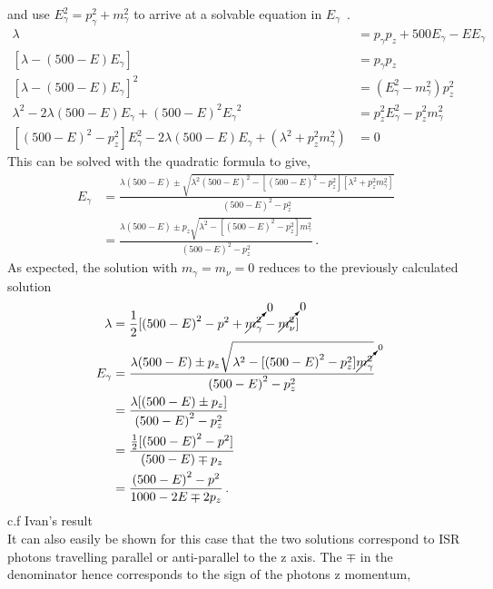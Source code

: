  and use  ${E}_{\gamma}^{2} = {p}_{\gamma}^{2} +{m}_{\gamma}^{2} $ to arrive at a solvable equation in ${E}_{\gamma} $\, .
  \begin{align}
 {\lambda} &=   {p}_{\gamma}{p}_{z} + 500{E}_{\gamma} - E{E}_{\gamma} \\
  [{\lambda} - (500 - E){E}_{\gamma} ] &=   {p}_{\gamma}{p}_{z} \\
    {[{\lambda} - (500 - E){E}_{\gamma} ]}^{2} &= ({E}_{\gamma}^{2} - {m}_{\gamma}^{2}){p}_{z}^{2} \\
    {\lambda}^{2} - 2{\lambda}(500 - E){E}_{\gamma}  + {(500 - E)}^{2}{{E}_{\gamma}}^{2} &=   {p}_{z}^{2}{E}_{\gamma}^{2} - {p}_{z}^{2}{m}_{\gamma}^{2} \\
        [{(500 - E)}^{2} -   {p}_{z}^{2}]{E}_{\gamma}^{2}  - 2{\lambda}(500 - E){E}_{\gamma} +  ({\lambda}^{2} + {p}_{z}^{2}{m}_{\gamma}^{2})  &= 0
     \end{align}
This can be solved with the quadratic formula to give,
  \begin{align}
 {E}_{\gamma} &= \frac{{\lambda}(500 - E)  \pm \sqrt{ {\lambda}^{2}{(500 - E)}^{2} - [{(500 - E)}^{2} -   {p}_{z}^{2}][{\lambda}^{2} + {p}_{z}^{2}{m}_{\gamma}^{2}] }}{{(500 - E)}^{2} -   {p}_{z}^{2}}\\
 					&= \frac{{\lambda}(500 - E)  \pm {p}_{z}\sqrt{ {\lambda}^{2} - [{(500 - E)}^{2} -   {p}_{z}^{2}]{m}_{\gamma}^{2}}}{{(500 - E)}^{2} -   {p}_{z}^{2}}\, .
     \end{align}
As expected, the solution with ${m}_{\gamma} = {m}_{\nu} =0$  reduces to the previously calculated solution
\begin{align}
 {\lambda} &= \frac{1}{2}[{(500 - E)}^2 - {p}^{2} + \cancelto{0}{{m}_{\gamma}^{2} }- \cancelto{0}{{m}_{\nu}^{2}}]\\
  {E}_{\gamma} &= \frac{{\lambda}(500 - E)  \pm {p}_{z}\sqrt{ {\lambda}^{2} - [{(500 - E)}^{2} -   {p}_{z}^{2}] \cancelto{0}{{m}_{\gamma}^{2}}}}{{(500 - E)}^{2} -   {p}_{z}^{2}}\\
  &= \frac{{\lambda}[(500 - E)  \pm {p}_{z}]}{{(500 - E)}^{2} -   {p}_{z}^{2}} \\
  &= \frac{ \frac{1}{2}[{(500 - E)}^2 - {p}^{2}]}{(500 - E)  \mp {p}_{z}} \\
   &= \frac{ {(500 - E)}^2 - {p}^{2}}{1000 -2 E  \mp 2{p}_{z}}\, .
     \end{align}
  c.f Ivan's result \cite{IvanMarchesini}
  \\
It can also easily be shown for this case that the two solutions correspond to ISR photons travelling parallel or anti-parallel to the z axis. The $\mp$ in the denominator hence corresponds to the sign of the photons z momentum,

